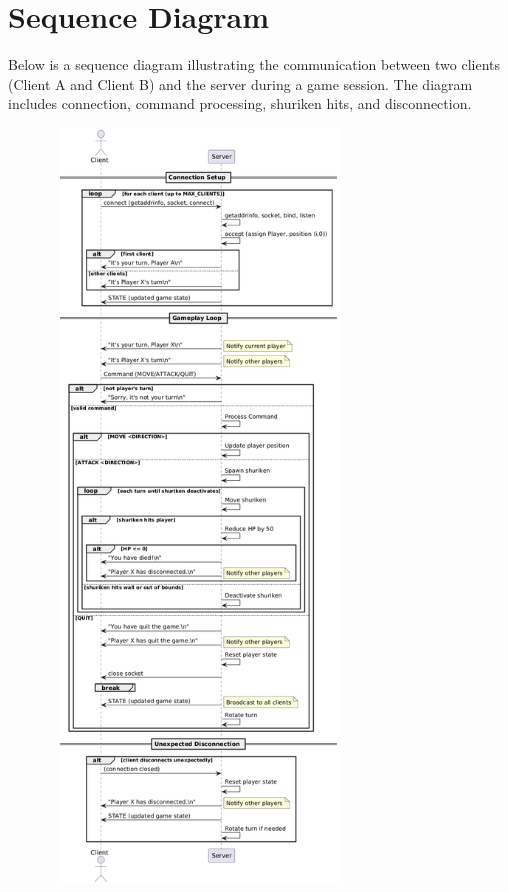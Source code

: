 \documentclass{article}
\begin{document}
\section*{Sequence Diagram}
Below is a sequence diagram illustrating the communication between two clients (Client A and Client B) and the server during a game session. The diagram includes connection, command processing, shuriken hits, and disconnection.
\begin{figure}[h]
    \centering
    \includegraphics[width=8cm, height=20cm]{sequence_diagram.png}
    \label{fig:sequence}
\end{figure}
\clearpage
\end{document}
